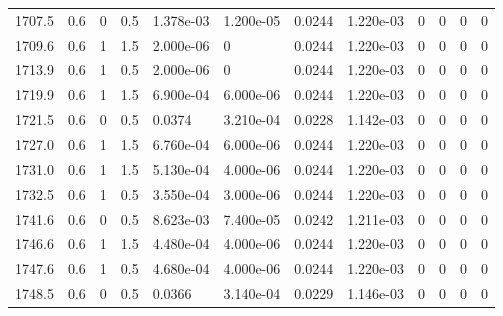 \documentclass[preview]{standalone}
\begin{document}
{{{{{{{{{{\begin{tabular}{L{1.2cm}C{1.2cm} C{0.3cm}C{0.5cm} C{1.4cm}C{1.4cm} C{1.4cm}C{1.4cm} C{1.6cm}C{1.6cm} C{1.6cm}C{1.6cm}}
  1707.5  &   0.6  & 0     & 0.5 &  1.378e-03  & 1.200e-05  &  0.0244&   1.220e-03& 0 & 0   &  0 & 0  \\ 
  1709.6  &   0.6  & 1     & 1.5 &  2.000e-06  & 0  &  0.0244&   1.220e-03& 0 & 0   &  0 & 0  \\ 
  1713.9  &   0.6  & 1     & 0.5 &  2.000e-06  & 0  &  0.0244&   1.220e-03& 0 & 0   &  0 & 0  \\ 
  1719.9  &   0.6  & 1     & 1.5 &  6.900e-04  & 6.000e-06  &  0.0244&   1.220e-03& 0 & 0   &  0 & 0  \\ 
  1721.5  &   0.6  & 0     & 0.5 &  0.0374  & 3.210e-04  &  0.0228&   1.142e-03& 0 & 0   &  0 & 0  \\ 
  1727.0  &   0.6  & 1     & 1.5 &  6.760e-04  & 6.000e-06  &  0.0244&   1.220e-03& 0 & 0   &  0 & 0  \\ 
  1731.0  &   0.6  & 1     & 1.5 &  5.130e-04  & 4.000e-06  &  0.0244&   1.220e-03& 0 & 0   &  0 & 0  \\ 
  1732.5  &   0.6  & 1     & 0.5 &  3.550e-04  & 3.000e-06  &  0.0244&   1.220e-03& 0 & 0   &  0 & 0  \\ 
  1741.6  &   0.6  & 0     & 0.5 &  8.623e-03  & 7.400e-05  &  0.0242&   1.211e-03& 0 & 0   &  0 & 0  \\ 
  1746.6  &   0.6  & 1     & 1.5 &  4.480e-04  & 4.000e-06  &  0.0244&   1.220e-03& 0 & 0   &  0 & 0  \\ 
  1747.6  &   0.6  & 1     & 0.5 &  4.680e-04  & 4.000e-06  &  0.0244&   1.220e-03& 0 & 0   &  0 & 0  \\ 
  1748.5  &   0.6  & 0     & 0.5 &  0.0366  & 3.140e-04  &  0.0229&   1.146e-03& 0 & 0   &  0 & 0  \\ 
\hline 
\end{tabular} 

}}}}}}}}}}
\end{document}
